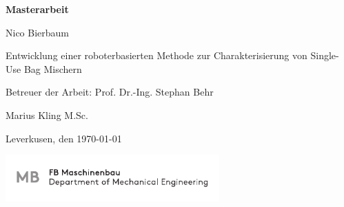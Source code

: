 \begin{minipage}[t]{11cm}
\vspace{2cm}					
\begin{Huge}
\begin{center}\textsf{\textbf{Masterarbeit}}\end{center}
\end{Huge}


\vspace{2cm} 								
\begin{Large}
\hfill 
\begin{center}

\begin{large}
	Nico Bierbaum
\end{large}

\vspace{2cm} %
\begin{flushright}
	\hfill{Entwicklung einer roboterbasierten Methode zur Charakterisierung von Single-Use Bag Mischern}\\
\end{flushright}			
\end{center}	
\end{Large}

\begin{large}
\vspace{30mm}  %
\hfill Betreuer der Arbeit: Prof. Dr.-Ing. Stephan Behr

\hfill Marius Kling M.Sc.\\
\end{large}

\vspace{35mm}
\hfill Leverkusen, den \today
\end{minipage}
\vspace{20mm}

\begin{minipage}[t]{136.5mm}
\begin{flushright}
\includegraphics[width=82mm]{bilder/MB_CMYK.pdf}
\end{flushright}
\end{minipage}
\restoregeometry
